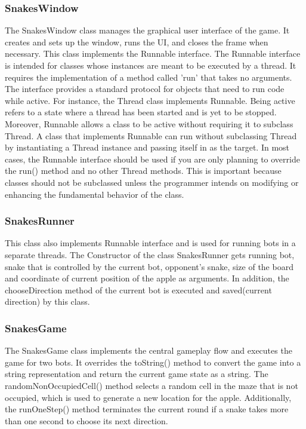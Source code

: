 \documentclass[a4paper,12pt]{article}
\begin{document}
\subsubsection{SnakesWindow}
The SnakesWindow class manages the graphical user interface of the game. It creates and sets up the window, runs the UI, and closes the frame when necessary. This class implements the Runnable interface.
The Runnable interface is intended for classes whose instances are meant to be executed by a thread. 
It requires the implementation of a method called 'run' that takes no arguments. The interface provides a standard protocol for objects that need to run code while active. For instance, the Thread class implements Runnable.
Being active refers to a state where a thread has been started and is yet to be stopped.\\
Moreover, Runnable allows a class to be active without requiring it to subclass Thread. A class that implements Runnable can run without subclassing Thread by instantiating a 
Thread instance and passing itself in as the target. In most cases, the Runnable interface should be used if you are only planning to override the run() method and no other Thread methods. This is important because classes should not be subclassed unless the programmer intends on modifying or enhancing the fundamental behavior of the class.\cite{runnable}
\subsubsection{SnakesRunner}
This class also implements Runnable interface and is used for running bots in a separate threads.
The Constructor of the class SnakesRunner gets running bot, snake that is controlled by the current bot,
opponent's snake, size of the board and coordinate of current position of the apple as arguments.
In addition, the chooseDirection method of the current bot is executed and saved(current direction) by this class. 
\subsubsection{SnakesGame}
The SnakesGame class implements the central gameplay flow and executes the game for two bots.
It overrides the toString() method to convert the game into a string representation and return the current game state as a string.
The randomNonOccupiedCell() method selects a random cell in the maze that is not occupied, which is used to generate a new location for the apple.
Additionally, the runOneStep() method terminates the current round if a snake takes more than one second to choose its next direction.
\end{document}
